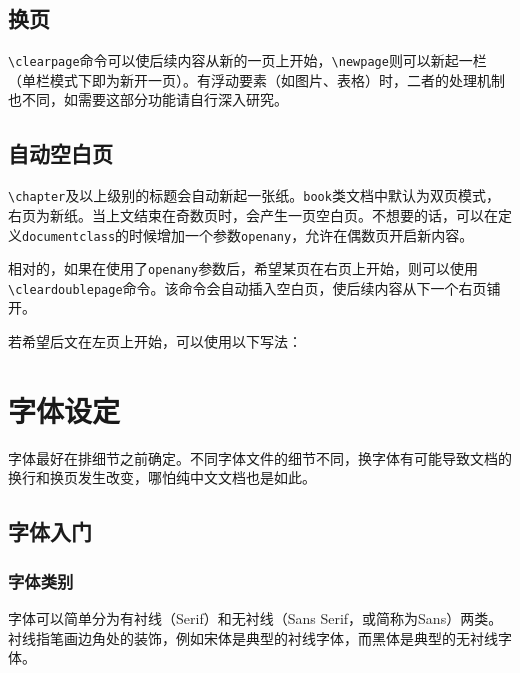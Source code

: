 \documentclass[10pt,openany]{book}
\begin{document}
\begin{sloppypar}


\section{换页}

\texttt{\textbackslash{}clearpage}命令可以使后续内容从新的一页上开始，\texttt{\textbackslash{}newpage}则可以新起一栏（单栏模式下即为新开一页）。有浮动要素（如图片、表格）时，二者的处理机制也不同，如需要这部分功能请自行深入研究。

\section{自动空白页}

\texttt{\textbackslash{}chapter}及以上级别的标题会自动新起一张纸。\texttt{book}类文档中默认为双页模式，右页为新纸。当上文结束在奇数页时，会产生一页空白页。不想要的话，可以在定义\texttt{documentclass}的时候增加一个参数\texttt{openany}，允许在偶数页开启新内容。



相对的，如果在使用了\texttt{openany}参数后，希望某页在右页上开始，则可以使用\texttt{\textbackslash{}cleardoublepage}命令。该命令会自动插入空白页，使后续内容从下一个右页铺开。

若希望后文在左页上开始，可以使用以下写法：



\chapter{字体设定}

字体最好在排细节之前确定。不同字体文件的细节不同，换字体有可能导致文档的换行和换页发生改变，哪怕纯中文文档也是如此。

\section{字体入门}

\subsection{字体类别}

字体可以简单分为有衬线（Serif）和无衬线（Sans Serif，或简称为Sans）两类。衬线指笔画边角处的装饰，例如宋体是典型的衬线字体，而黑体是典型的无衬线字体。


\end{sloppypar}
\end{document}
